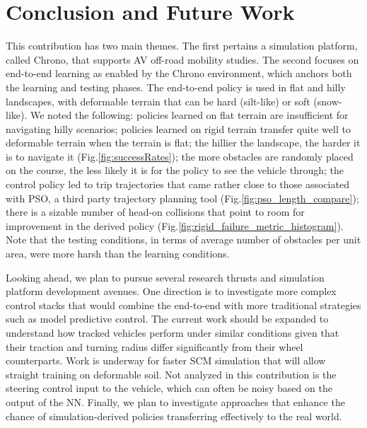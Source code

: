 
\section{Conclusion and Future Work}
\label{sec:conclusions}
This contribution has two main themes. The first pertains a simulation platform, called Chrono, that supports AV off-road mobility studies. The second focuses on end-to-end learning as enabled by the Chrono environment, which anchors both the learning and testing phases. The end-to-end policy is used in flat and hilly landscapes, with deformable terrain that can be hard (silt-like) or soft (snow-like). We noted the following: policies learned on flat terrain are insufficient for navigating hilly scenarios; policies learned on rigid terrain transfer quite well to deformable terrain when the terrain is flat; the hillier the landscape, the harder it is to navigate it (Fig.\ref{fig:successRates}); the more obstacles are randomly placed on the course, the less likely it is for the policy to see the vehicle through; the control policy led to trip trajectories that came rather close to those associated with PSO, a third party trajectory planning tool (Fig.\ref{fig:pso_length_compare}); there is a sizable number of head-on collisions that point to room for improvement in the derived policy (Fig.\ref{fig:rigid_failure_metric_histogram}). Note that the testing conditions, in terms of average number of obstacles per unit area, were more harsh than the learning conditions.

Looking ahead, we plan to pursue several research thrusts and simulation platform development avenues. One direction is to investigate more complex control stacks that would combine the end-to-end with more traditional strategies such as model predictive control. The current work should be expanded to understand how tracked vehicles perform under similar conditions given that their traction and turning radius differ significantly from their wheel counterparts. Work is underway for faster SCM simulation that will allow straight training on deformable soil. Not analyzed in this contribution is the steering control input to the vehicle, which can often be noisy based on the output of the NN. Finally, we plan to investigate approaches that enhance the chance of simulation-derived policies transferring effectively to the real world.



